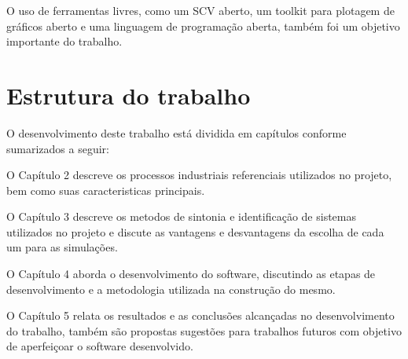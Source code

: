     O uso de ferramentas livres, como um \ac{SCV} aberto, um toolkit para plotagem
    de gráficos aberto e uma linguagem de programação aberta, também foi um objetivo
    importante do trabalho.

\section{Estrutura do trabalho}

    O desenvolvimento deste trabalho está dividida em capítulos conforme sumarizados
    a seguir:

    O Capítulo 2 descreve os processos industriais referenciais utilizados no projeto,
    bem como suas caracteristicas principais.
    
    O Capítulo 3 descreve os metodos de sintonia e identificação de sistemas utilizados
    no projeto e discute as vantagens e desvantagens da escolha de cada um para as
    simulações.
    
    O Capítulo 4 aborda o desenvolvimento do software, discutindo as etapas de
    desenvolvimento e a metodologia utilizada na construção do mesmo.
    
    O Capítulo 5 relata os resultados e as conclusões alcançadas no desenvolvimento do
    trabalho, também são propostas sugestões para trabalhos futuros com objetivo de
    aperfeiçoar o software desenvolvido.
